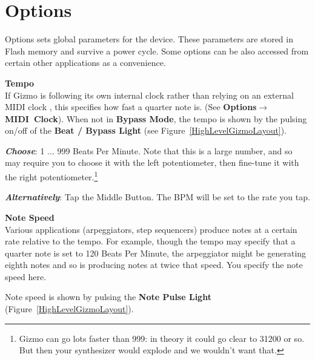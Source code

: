 \documentclass{article}
\begin{document}
\section {Options}
\label{options}

	Options sets global parameters for the device.  These parameters are stored in Flash memory and survive a power cycle.  Some options can be also accessed from certain other applications as a convenience.  
	
	\begin{description}


	\item{\bf Tempo}\\
	If Gizmo is following its own internal clock rather than relying on an external MIDI clock , this specifies how fast a quarter note is.  (See {\bf Options\(\boldsymbol\rightarrow\)MIDI~Clock}).  When not in {\bf Bypass Mode}, the tempo is shown by the pulsing on/off of the {\bf Beat / Bypass Light} (see Figure~\ref{HighLevelGizmoLayout}). 
	
		\begin{description}
		\item{\bf \textit{Choose}}: 1 ... 999 Beats Per Minute.  Note that this is a large number, and so may require you to choose it with the left potentiometer, then fine-tune it with the right potentiometer.\footnote{Gizmo can go lots faster than 999: in theory it could go clear to 31200 or so.  But then your synthesizer would explode and we wouldn't want that.}
		\item{\bf \textit{Alternatively}}: Tap the Middle Button.  The BPM will be set to the rate you tap.
		\end{description}
		
	\item{\bf Note Speed}\\
		Various applications (arpeggiators, step sequencers)
		produce notes at a certain rate relative to the tempo.
		For example, though the tempo may specify that a
		quarter note is set to 120 Beats Per Minute, the 
		arpeggiator might be generating eighth notes and
		so is producing notes at twice that speed.  You specify the 
		note speed here.
		
		Note speed is shown by pulsing the {\bf Note Pulse Light} (Figure~\ref{HighLevelGizmoLayout}).


\end{description}
\end{document}
